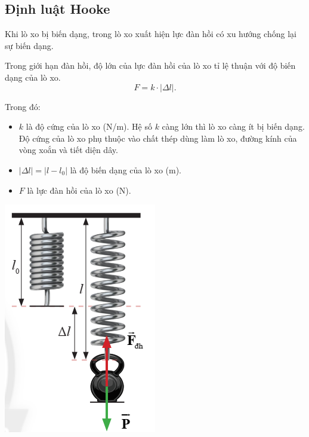 \subsection{Định luật Hooke}
\begin{minipage}{0.6\textwidth}
	
	Khi lò xo bị biến dạng, trong lò xo xuất hiện lực đàn hồi có xu hướng chống lại sự biến dạng. 			
	
	Trong giới hạn đàn hồi, độ lớn của lực đàn hồi của lò xo tỉ lệ thuận với độ biến dạng của lò xo.
	\begin{equation*}
		F= k \cdot |\Delta l|.
	\end{equation*}
	
	Trong đó:
	\begin{itemize}
		\item $k$ là độ cứng của lò xo (N/m). Hệ số $k$ càng lớn thì lò xo càng ít bị biến dạng. Độ cứng của lò xo phụ thuộc vào chất thép dùng làm lò xo, đường kính của vòng xoắn và tiết diện
		dây.
		\item $|\Delta l|=|l-l_0|$ là độ biến dạng của lò xo (m).
		\item $F$ là lực đàn hồi của lò xo (N).
	\end{itemize}
\end{minipage}
\begin{minipage}{0.4\textwidth}
	\begin{center}
		\includegraphics[scale=0.3]{../figs/G10-028-5}
	\end{center}
	
\end{minipage}
